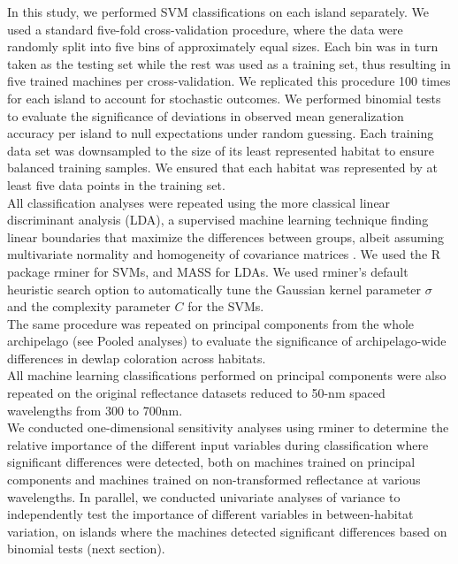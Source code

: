 In this study, we performed SVM classifications on each island separately. We used a standard five-fold cross-validation procedure, where the data were randomly split into five bins of approximately equal sizes. Each bin was in turn taken as the testing set while the rest was used as a training set, thus resulting in five trained machines per cross-validation. We replicated this procedure 100 times for each island to account for stochastic outcomes. We performed binomial tests to evaluate the significance of deviations in observed mean generalization accuracy per island to null expectations under random guessing. Each training data set was downsampled to the size of its least represented habitat to ensure balanced training samples. We ensured that each habitat was represented by at least five data points in the training set.\\ 

All classification analyses were repeated using the more classical linear discriminant analysis (LDA), a supervised machine learning technique finding linear boundaries that maximize the differences between groups, albeit assuming multivariate normality and homogeneity of covariance matrices \citep{Ripley1996a}. We used the R package rminer \citep{Cortez2010, Cortez2016} for SVMs, and MASS \citep{Venables2002} for LDAs. We used rminer's default heuristic search option to automatically tune the Gaussian kernel parameter $\sigma$ and the complexity parameter $C$ for the SVMs.\\

The same procedure was repeated on principal components from the whole archipelago (see Pooled analyses) to evaluate the significance of archipelago-wide differences in dewlap coloration across habitats.\\ 

All machine learning classifications performed on principal components were also repeated on the original reflectance datasets reduced to 50-nm spaced wavelengths from 300 to 700nm.\\

We conducted one-dimensional sensitivity analyses using rminer \citep{Cortez2013} to determine the relative importance of the different input variables during classification where significant differences were detected, both on machines trained on principal components and machines trained on non-transformed reflectance at various wavelengths. In parallel, we conducted univariate analyses of variance to independently test the importance of different variables in between-habitat variation, on islands where the machines detected significant differences based on binomial tests (next section).

